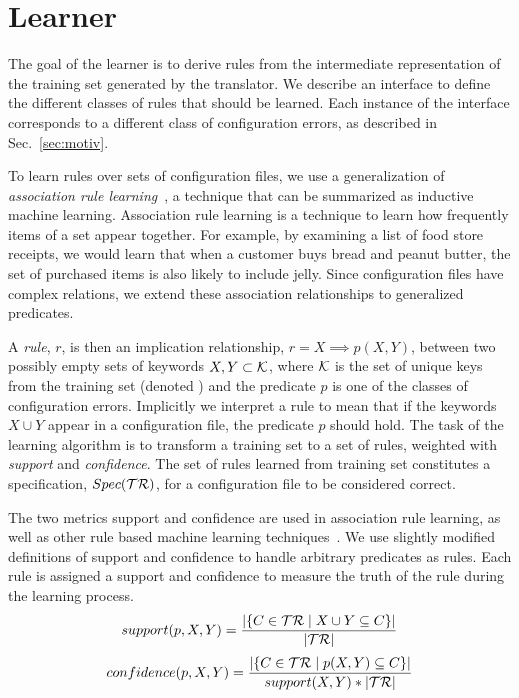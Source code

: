 \section{Learner}
\label{sec-learn}

The goal of the learner is to derive rules from the intermediate representation of the training set generated by the translator.
We describe an interface to define the different classes of rules that should be learned.
Each instance of the interface corresponds to a different class of configuration errors, as described in Sec.~\ref{sec:motiv}.

To learn rules over sets of configuration files, we use a generalization of \textit{association rule learning}~\cite{agrawal1993mining}, a technique that can be summarized as inductive machine learning.
Association rule learning is a technique to learn how frequently items of a set appear together.
For example, by examining a list of food store receipts, we would learn that when a customer buys bread and peanut butter, the set of purchased items is also likely to include jelly.
Since configuration files have complex relations, we extend these association relationships to generalized predicates.

A \textit{rule}, $r$, is then an implication relationship, $r = X \implies p(X,Y)$, between two possibly empty sets of keywords $X,Y \subset \mathcal{K}$, where $\mathcal{K}$ is the set of unique keys from the training set (denoted \trainingSet) and the predicate $p$ is one of the classes of configuration errors.
Implicitly we interpret a rule to mean that if the keywords $X\cup Y$ appear in a configuration file, the predicate $p$ should hold.
The task of the learning algorithm is to transform a training set to a set of rules, weighted with \textit{support} and \textit{confidence}.
The set of rules learned from training set \trainingSet constitutes a specification, $Spec(\mathcal{TR})$, for a configuration file to be considered correct.

The two metrics support and confidence are used in association rule learning, as well as other rule based machine learning techniques~\cite{han2007frequent,langley1995applications}.
We use slightly modified definitions of support and confidence to handle arbitrary predicates as rules.
Each rule is assigned a support and confidence to measure the truth of the rule during the learning process.
%
\begin{equation}
 support(p,X,Y) = \frac{|\{C \in \mathcal{TR} \mid X \cup Y \subseteq C\}|} {|\mathcal{TR}|}
\end{equation}
\begin{equation}
 confidence(p,X,Y) = \frac{|\{C \in \mathcal{TR} \mid p(X,Y) \subseteq C\}| } {support(X,Y)*|\mathcal{TR}|}
\end{equation}

